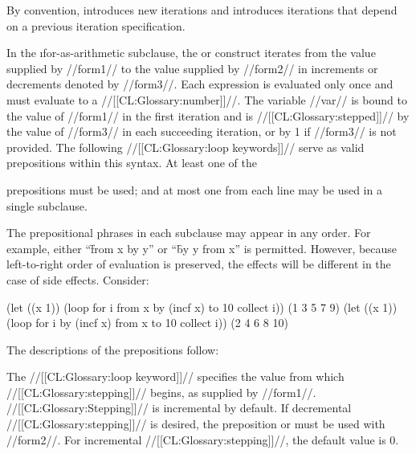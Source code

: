 By convention,  introduces new iterations and 
introduces iterations that depend on a previous iteration specification.


In the \i{for-as-arithmetic} subclause, the  
or  construct iterates from the value supplied by
//form1// to the value supplied by //form2// in increments or
decrements denoted by //form3//. Each
expression is evaluated only once and must evaluate to a //[[CL:Glossary:number]]//.  
The variable //var// is bound to the value of 
//form1// in the first iteration and is //[[CL:Glossary:stepped]]//
by the value of //form3// in each succeeding iteration,
or by 1 if //form3// is not provided.  
The following //[[CL:Glossary:loop keywords]]// serve as valid prepositions within this 
syntax.
At least one of the 

prepositions must be used; 
and at most one from each line may be used in a single subclause.

\beginlist                 
 
 
 
\endlist

The prepositional phrases in each subclause may appear in any order.
For example, either ``\f{from x by y}'' or ``\f{by y from x}'' is permitted.
However, because left-to-right order of evaluation is preserved,
the effects will be different in the case of side effects.
%
Consider:

\code
(let ((x 1)) (loop for i from x by (incf x) to 10 collect i))
\EV (1 3 5 7 9)
(let ((x 1)) (loop for i by (incf x) from x to 10 collect i))
\EV (2 4 6 8 10)
\endcode

 
The descriptions of the prepositions follow:
 
\beginlist
{}
 
The //[[CL:Glossary:loop keyword]]//  specifies the value from which
//[[CL:Glossary:stepping]]// begins, as supplied by //form1//.  
//[[CL:Glossary:Stepping]]// is incremental by default.  If 
decremental //[[CL:Glossary:stepping]]// is desired, 
the preposition  
or  must be used with //form2//.  For incremental
//[[CL:Glossary:stepping]]//, the default  value is 0.

